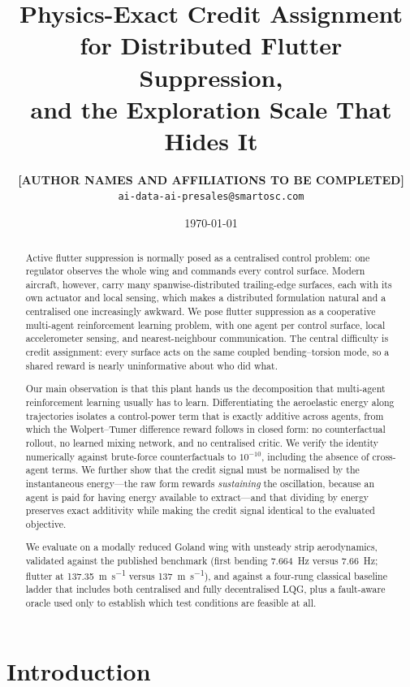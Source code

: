 \documentclass[11pt,a4paper]{article}
\title{Physics-Exact Credit Assignment for Distributed Flutter Suppression,\\
and the Exploration Scale That Hides It}
\author{%
  \textbf{[AUTHOR NAMES AND AFFILIATIONS TO BE COMPLETED]}\\
  \texttt{ai-data-ai-presales@smartosc.com}
}
\date{\today}
\begin{document}
\maketitle

\begin{abstract}
Active flutter suppression is normally posed as a centralised control problem: one
regulator observes the whole wing and commands every control surface. Modern
aircraft, however, carry many spanwise-distributed trailing-edge surfaces, each
with its own actuator and local sensing, which makes a distributed formulation
natural and a centralised one increasingly awkward. We pose flutter suppression as
a cooperative multi-agent reinforcement learning problem, with one agent per
control surface, local accelerometer sensing, and nearest-neighbour
communication. The central difficulty is credit assignment: every surface acts on
the same coupled bending--torsion mode, so a shared reward is nearly
uninformative about who did what.

Our main observation is that this plant hands us the decomposition that
multi-agent reinforcement learning usually has to learn. Differentiating the
aeroelastic energy along trajectories isolates a control-power term that is
exactly additive across agents, from which the Wolpert--Tumer difference reward
follows in closed form: no counterfactual rollout, no learned mixing network, and
no centralised critic. We verify the identity numerically against brute-force
counterfactuals to $10^{-10}$, including the absence of cross-agent terms. We
further show that the credit signal must be normalised by the instantaneous
energy---the raw form rewards \emph{sustaining} the oscillation, because an agent
is paid for having energy available to extract---and that dividing by energy
preserves exact additivity while making the credit signal identical to the
evaluated objective.

We evaluate on a modally reduced Goland wing with unsteady strip aerodynamics,
validated against the published benchmark (first bending \SI{7.664}{\hertz} versus
\SI{7.66}{\hertz}; flutter at \SI{137.35}{\metre\per\second} versus
\SI{137}{\metre\per\second}), and against a four-rung classical baseline ladder
that includes both centralised and fully decentralised LQG, plus a fault-aware
oracle used only to establish which test conditions are feasible at all.
\ResultsSummarySentence

\end{abstract}

\section{Introduction}
\end{document}
